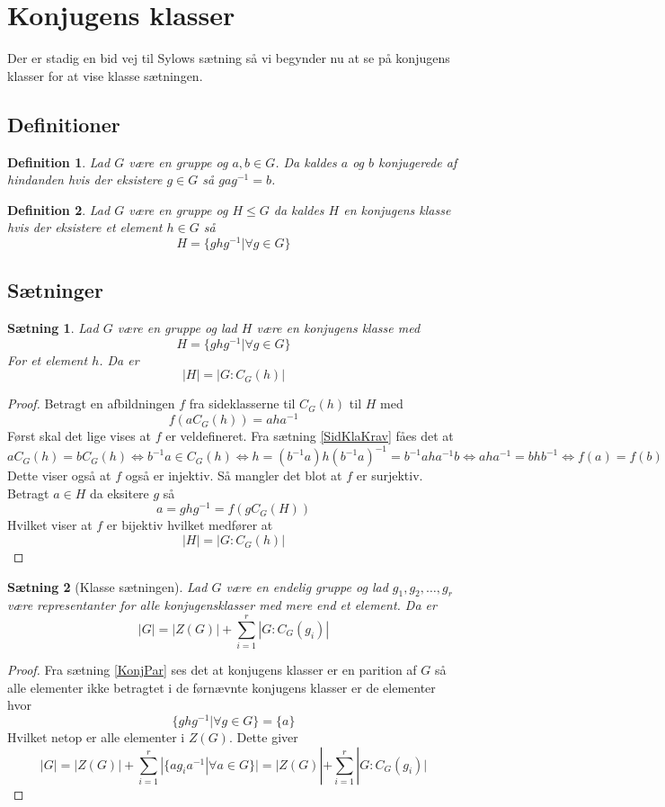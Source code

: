 \documentclass{article}
\newcommand{\inv}{^{-1}}
\newcommand{\biimp}{\Leftrightarrow}
\newtheorem{setn}{Sætning}
\newtheorem{defi}{Definition}
\begin{document}
	\section*{Konjugens klasser}
		Der er stadig en bid vej til Sylows sætning så vi begynder nu at se på
		konjugens klasser for at vise klasse sætningen.
		\subsection*{Definitioner}
		\begin{defi}
			Lad $G$ være en gruppe og $a,b \in G$. Da kaldes $a$ og $b$ konjugerede af
			hindanden hvis der eksistere $g \in G$ så $gag\inv = b$.
		\end{defi}
		\begin{defi}
			Lad $G$ være en gruppe og $H \le G$ da kaldes $H$
			en konjugens klasse hvis der eksistere et element $h \in G$ så
			$$H = \{ghg\inv | \forall g \in G\}$$
		\end{defi}
		\subsection*{Sætninger}
		\begin{setn}
			Lad $G$ være en gruppe og lad $H$ være en konjugens klasse med
				$$H = \{ghg\inv | \forall g \in G\}$$
			For et element $h$. Da er
			$$|H| = |G:C_G(h)|$$
		\end{setn}
		\begin{proof}
			Betragt en afbildningen $f$ fra sideklasserne til $C_G(h)$ til $H$ med
			$$f(aC_G(h)) = aha\inv$$
			Først skal det lige vises at $f$ er veldefineret.
			Fra sætning \ref{SidKlaKrav} fåes det at
			$$aC_G(h)=bC_G(h) \biimp b\inv a \in C_G(h) \biimp h = (b\inv a)h(b\inv a)\inv =
			b\inv aha\inv b \biimp aha\inv = bhb\inv \biimp f(a) = f(b)$$
			Dette viser også at $f$ også er injektiv. Så mangler det blot at $f$ er surjektiv.
			Betragt $a \in H$ da eksitere $g$ så
			$$a = ghg\inv = f(gC_G(H))$$
			Hvilket viser at $f$ er bijektiv hvilket medfører at
			$$|H| = |G:C_G(h)|$$
		\end{proof}
		\begin{setn}[Klasse sætningen]
			Lad $G$ være en endelig gruppe og lad $g_1,g_2,\dots,g_r$ være representanter
			for alle konjugensklasser med mere end et element. Da er
			$$|G| = |Z(G)| + \sum_{i=1}^r|G:C_G(g_i)|$$
		\end{setn}
		\begin{proof}
			Fra sætning \ref{KonjPar} ses
			det at konjugens klasser er en parition af $G$ så alle elementer ikke betragtet
			i de førnævnte konjugens klasser er de elementer hvor
			$$\{ghg\inv | \forall g \in G\} = \{a\}$$
			Hvilket netop er alle elementer i $Z(G)$. Dette giver
			$$|G| = |Z(G)| + \sum_{i=1}^r|\{ag_ia\inv | \forall a \in G\}| =
			|Z(G)| + \sum_{i=1}^r|G:C_G(g_i)|$$
		\end{proof}
\end{document}
